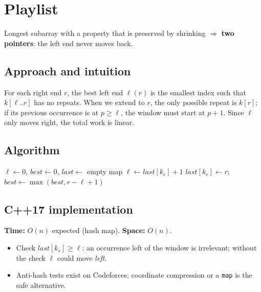 \section{Playlist}
\label{sec:g-playlist}


\begin{patternbox}
Longest subarray with a property that is preserved by shrinking
$\Rightarrow$ \textbf{two pointers}: the left end never moves back.
\end{patternbox}

\subsection*{Approach and intuition}

For each right end $r$, the best left end $\ell(r)$ is the smallest index
such that $k[\ell..r]$ has no repeats. When we extend to $r$, the only possible
repeat is $k[r]$; if its previous occurrence is at $p\ge\ell$, the window must
start at $p+1$. Since $\ell$ only moves right, the total work is linear.

\subsection*{Algorithm}
\begin{algorithmic}[1]
\State $\ell\gets0$, $best\gets0$, $last\gets$ empty map
   \State $\ell\gets last[k_r]+1$ \EndIf
  \State $last[k_r]\gets r$; $best\gets\max(best,r-\ell+1)$
\EndFor
\end{algorithmic}


\subsection*{C++17 implementation}

\begin{complexitybox}
\textbf{Time:} $O(n)$ expected (hash map). \textbf{Space:} $O(n)$.
\end{complexitybox}

\begin{pitfallbox}
\begin{itemize}
  \item Check $last[k_r]\ge\ell$: an occurrence left of the window is
        irrelevant; without the check $\ell$ could move \emph{left}.
  \item Anti-hash tests exist on Codeforces; coordinate compression or a
        \texttt{map} is the safe alternative.
\end{itemize}
\end{pitfallbox}

